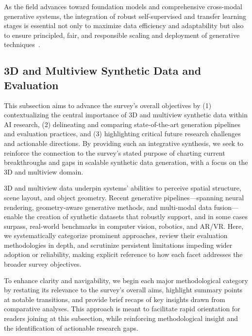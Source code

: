 \documentclass[sigconf]{acmart}
\begin{document}
As the field advances toward foundation models and comprehensive cross-modal generative systems, the integration of robust self-supervised and transfer learning stages is essential not only to maximize data efficiency and adaptability but also to ensure principled, fair, and responsible scaling and deployment of generative techniques~\cite{ref1,ref2,ref3,ref5,ref6,ref10,ref12,ref13,ref14,ref15,ref16,ref18,ref21,ref22,ref23,ref24,ref25,ref26,ref29,ref30,ref32,ref54,ref55,ref60,ref61,ref62,ref64,ref65,ref66,ref70,ref73,ref74,ref76,ref79,ref81,ref83,ref85,ref89,ref90,ref91,ref92,ref93,ref94,ref95,ref96,ref97,ref100,ref101,ref102}.

\subsection{3D and Multiview Synthetic Data and Evaluation}
This subsection aims to advance the survey’s overall objectives by (1) contextualizing the central importance of 3D and multiview synthetic data within AI research, (2) delineating and comparing state-of-the-art generation pipelines and evaluation practices, and (3) highlighting critical future research challenges and actionable directions. By providing such an integrative synthesis, we seek to reinforce the connection to the survey’s stated purpose of charting current breakthroughs and gaps in scalable synthetic data generation, with a focus on the 3D and multiview domain.

3D and multiview data underpin systems’ abilities to perceive spatial structure, scene layout, and object geometry. Recent generative pipelines—spanning neural rendering, geometry-aware generative methods, and multi-modal data fusion—enable the creation of synthetic datasets that robustly support, and in some cases surpass, real-world benchmarks in computer vision, robotics, and AR/VR. Here, we systematically categorize prominent approaches, review their evaluation methodologies in depth, and scrutinize persistent limitations impeding wider adoption or reliability, making explicit reference to how each facet addresses the broader survey objectives.

To enhance clarity and navigability, we begin each major methodological category by restating its relevance to the survey’s overall aims, highlight summary points at notable transitions, and provide brief recaps of key insights drawn from comparative analyses. This approach is meant to facilitate rapid orientation for readers joining at this subsection, while reinforcing methodological insight and the identification of actionable research gaps.
\end{document}
